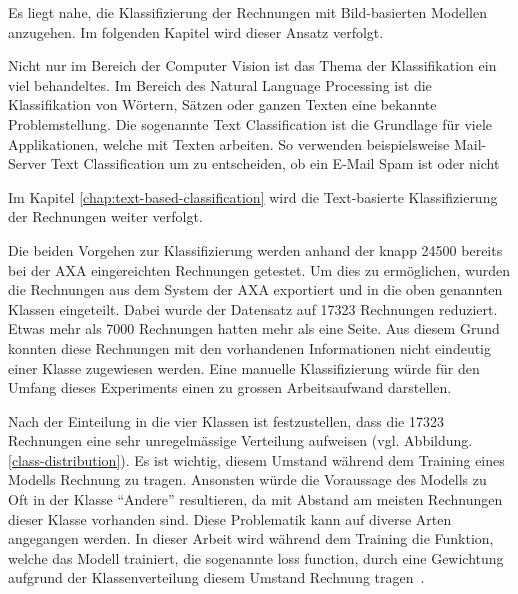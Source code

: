 
Es liegt nahe, die Klassifizierung der Rechnungen mit Bild-basierten Modellen anzugehen. Im folgenden Kapitel wird dieser Ansatz verfolgt.

Nicht nur im Bereich der Computer Vision ist das Thema der Klassifikation ein viel behandeltes. Im Bereich des Natural Language Processing ist die Klassifikation von Wörtern, Sätzen oder ganzen Texten eine bekannte Problemstellung. Die sogenannte Text Classification ist die Grundlage für viele Applikationen, welche mit Texten arbeiten. So verwenden beispielsweise Mail-Server Text Classification um zu entscheiden, ob ein E-Mail Spam ist oder nicht~\autocite{GoogleTextClassification}

Im Kapitel \ref{chap:text-based-classification} wird die Text-basierte Klassifizierung der Rechnungen weiter verfolgt.

Die beiden Vorgehen zur Klassifizierung werden anhand der knapp 24500 bereits bei der AXA eingereichten Rechnungen getestet. Um dies zu ermöglichen, wurden die Rechnungen aus dem System der AXA exportiert und in die oben genannten Klassen eingeteilt. Dabei wurde der Datensatz auf 17323 Rechnungen reduziert. Etwas mehr als 7000 Rechnungen hatten mehr als eine Seite. Aus diesem Grund konnten diese Rechnungen mit den vorhandenen Informationen nicht eindeutig einer Klasse zugewiesen werden. Eine manuelle Klassifizierung würde für den Umfang dieses Experiments einen zu grossen Arbeitsaufwand darstellen.

Nach der Einteilung in die vier Klassen ist festzustellen, dass die 17323 Rechnungen eine sehr unregelmässige Verteilung aufweisen (vgl. Abbildung. \ref{class-distribution}). Es ist wichtig, diesem Umstand während dem Training eines Modells Rechnung zu tragen. Ansonsten würde die Voraussage des Modells zu Oft in der Klasse \enquote{Andere} resultieren, da mit Abstand am meisten Rechnungen dieser Klasse vorhanden sind. Diese Problematik kann auf diverse Arten angegangen werden. In dieser Arbeit wird während dem Training die Funktion, welche das Modell trainiert, die sogenannte loss function, durch eine Gewichtung aufgrund der Klassenverteilung diesem Umstand Rechnung tragen~\autocite{Buda2018}.

